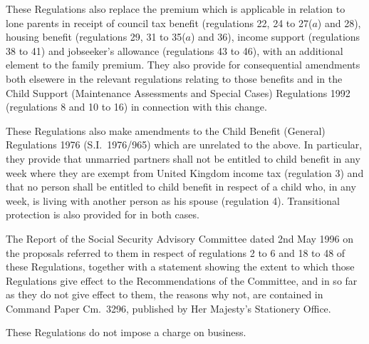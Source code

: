 \documentclass[a4paper]{article}
\begin{document}
  These Regulations also replace the premium which is applicable in relation to lone parents in receipt of council tax benefit (regulations 22, 24 to 27($a$) and 28), housing benefit (regulations 29, 31 to 35($a$) and 36), income support (regulations 38 to 41) and jobseeker’s allowance (regulations 43 to 46), with an additional element to the family premium. They also provide for consequential amendments both elsewere in the relevant regulations relating to those benefits and in the Child Support (Maintenance Assessments and Special Cases) Regulations 1992 (regulations 8 and 10 to 16) in connection with this change.

  These Regulations also make amendments to the Child Benefit (General) Regulations 1976 (S.I.\ 1976/965) which are unrelated to the above. In particular, they provide that unmarried partners shall not be entitled to child benefit in any week where they are exempt from United Kingdom income tax (regulation 3) and that no person shall be entitled to child benefit in respect of a child who, in any week, is living with another person as his spouse (regulation 4). Transitional protection is also provided for in both cases.

  The Report of the Social Security Advisory Committee dated 2nd May 1996 on the proposals referred to them in respect of regulations 2 to 6 and 18 to 48 of these Regulations, together with a statement showing the extent to which those Regulations give effect to the Recommendations of the Committee, and in so far as they do not give effect to them, the reasons why not, are contained in Command Paper Cm.\ 3296, published by Her Majesty’s Stationery Office.

  These Regulations do not impose a charge on business.
\end{document}
